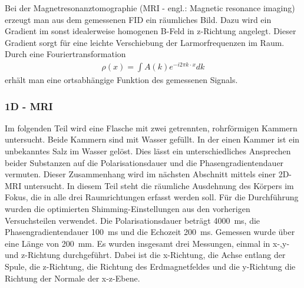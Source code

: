 \documentclass[../../main.tex]{subfiles}
\begin{document}
    Bei der Magnetresonanztomographie (MRI - engl.: Magnetic resonance imaging) erzeugt man aus dem gemessenen FID ein räumliches Bild. Dazu wird ein Gradient im sonst idealerweise homogenen B-Feld in z-Richtung angelegt. Dieser Gradient sorgt für eine leichte Verschiebung der Larmorfrequenzen im Raum. Durch eine Fouriertransformation 
    \begin{align}
        \rho(x) = \int A(k) e^{-i2\pi k\cdot x}dk
    \end{align}
    erhält man eine ortsabhängige Funktion des gemessenen Signals.
    
    \subsubsection{1D - MRI}
        Im folgenden Teil wird eine Flasche mit zwei getrennten, rohrförmigen Kammern untersucht. Beide Kammern sind mit Wasser gefüllt. In der einen Kammer ist ein unbekanntes Salz im Wasser gelöst. Dies lässt ein unterschiedliches Ansprechen beider Substanzen auf die Polarisationsdauer und die Phasengradientendauer vermuten. Dieser Zusammenhang wird im nächsten Abschnitt mittels einer 2D-MRI untersucht. In diesem Teil steht die räumliche Ausdehnung des Körpers im Fokus, die in alle drei Raumrichtungen erfasst werden soll. Für die Durchführung wurden die optimierten Shimming-Einstellungen aus den vorherigen Versuchsteilen verwendet. Die Polarisationsdauer beträgt \SI{4000}{\milli \second}, die Phasengradientendauer \SI{100}{\milli \second} und die Echozeit \SI{200}{\milli \second}. Gemessen wurde über eine Länge von \SI{200}{\milli \metre}. Es wurden insgesamt drei Messungen, einmal in x-,y- und z-Richtung durchgeführt. Dabei ist die x-Richtung, die Achse entlang der Spule, die z-Richtung, die Richtung des Erdmagnetfeldes und die y-Richtung die Richtung der Normale der x-z-Ebene.
\end{document}
